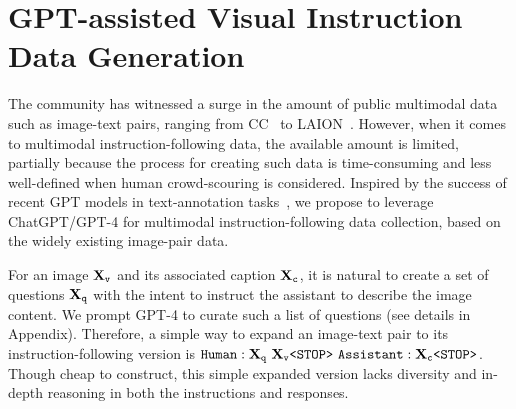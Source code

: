 \section{GPT-assisted Visual Instruction Data Generation}
\label{sec:visual_instruc_data}

The community has witnessed a surge in the amount of public multimodal data such as image-text pairs, ranging from CC~\cite{changpinyo2021conceptual} to LAION~\cite{schuhmann2022laion}. However, when it comes to multimodal instruction-following data, the available amount is limited, partially because the process for creating such data is time-consuming and less well-defined when human crowd-scouring is considered. Inspired by the success of recent GPT models in text-annotation tasks~\cite{gilardi2023chatgpt}, we propose to leverage ChatGPT/GPT-4 for multimodal instruction-following data collection, based on the widely existing image-pair data.


For an image ${{\bf X}}_{\texttt{v}}$ and its associated caption ${{\bf X}}_{\texttt{c}}$, it is natural to create a set of questions ${{\bf X}}_{\texttt{q}}$ with the intent to instruct the assistant to describe the image content. We prompt GPT-4 to curate such a list of questions (see details in Appendix).
Therefore, a simple way to expand an image-text pair to its instruction-following version is
$
\texttt{Human}: {{\bf X}}_{\texttt{q}} ~{{\bf X}}_{\texttt{v}}     \texttt{<STOP>}~
    \texttt{Assistant}: 
    {{\bf X}}_{\texttt{c} } 
     \texttt{<STOP>}
$. 
Though cheap to construct, this simple expanded version lacks diversity and in-depth reasoning in both the instructions and responses.

